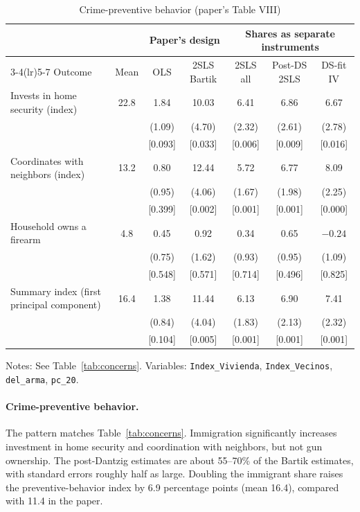 \documentclass[11pt]{article}
\begin{document}
\begin{table}[htbp]
\centering
\small
\begin{threeparttable}
\caption{Crime-preventive behavior (paper's Table VIII)}
\label{tab:prevent}
\begin{tabular}{lcccccc}
\toprule
 & & \multicolumn{2}{c}{Paper's design} & \multicolumn{3}{c}{Shares as separate instruments}\\
\cmidrule(lr){3-4}\cmidrule(lr){5-7}
Outcome & Mean & OLS & 2SLS Bartik & 2SLS all & Post-DS 2SLS & DS-fit IV \\
\midrule
Invests in home security (index) & 22.8 & 1.84 & 10.03 & 6.41 & 6.86 & 6.67 \\
 & & (1.09) & (4.70) & (2.32) & (2.61) & (2.78) \\
 & & [0.093] & [0.033] & [0.006] & [0.009] & [0.016] \\
\addlinespace
Coordinates with neighbors (index) & 13.2 & 0.80 & 12.44 & 5.72 & 6.77 & 8.09 \\
 & & (0.95) & (4.06) & (1.67) & (1.98) & (2.25) \\
 & & [0.399] & [0.002] & [0.001] & [0.001] & [0.000] \\
\addlinespace
Household owns a firearm & 4.8 & 0.45 & 0.92 & 0.34 & 0.65 & $-0.24$ \\
 & & (0.75) & (1.62) & (0.93) & (0.95) & (1.09) \\
 & & [0.548] & [0.571] & [0.714] & [0.496] & [0.825] \\
\addlinespace
Summary index (first principal component) & 16.4 & 1.38 & 11.44 & 6.13 & 6.90 & 7.41 \\
 & & (0.84) & (4.04) & (1.83) & (2.13) & (2.32) \\
 & & [0.104] & [0.005] & [0.001] & [0.001] & [0.001] \\
\bottomrule
\end{tabular}
\begin{tablenotes}[flushleft]
\footnotesize
\item Notes: See Table~\ref{tab:concerns}. Variables: \texttt{Index\_Vivienda},
\texttt{Index\_Vecinos}, \texttt{del\_arma}, \texttt{pc\_20}.
\end{tablenotes}
\end{threeparttable}
\end{table}

\paragraph{Crime-preventive behavior.} The pattern matches Table~\ref{tab:concerns}.
Immigration significantly increases investment in home security and coordination with
neighbors, but not gun ownership. The post-Dantzig estimates are about 55--70\% of the
Bartik estimates, with standard errors roughly half as large. Doubling the immigrant share
raises the preventive-behavior index by 6.9 percentage points (mean 16.4), compared with
11.4 in the paper.
\end{document}
